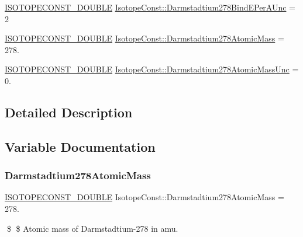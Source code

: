 \begin{DoxyCompactItemize}
\item 
\mbox{\hyperlink{group___isotope_const-_macros_ga8f45a7272ce02c0b4c65c44636ed719a}{I\+S\+O\+T\+O\+P\+E\+C\+O\+N\+S\+T\+\_\+\+D\+O\+U\+B\+LE}} \mbox{\hyperlink{group___isotope_const-_darmstadtium-_ds278_ga21a83523d3380e33e6805161f7bcd491}{Isotope\+Const\+::\+Darmstadtium278\+Bind\+E\+Per\+A\+Unc}} = 2
\item 
\mbox{\hyperlink{group___isotope_const-_macros_ga8f45a7272ce02c0b4c65c44636ed719a}{I\+S\+O\+T\+O\+P\+E\+C\+O\+N\+S\+T\+\_\+\+D\+O\+U\+B\+LE}} \mbox{\hyperlink{group___isotope_const-_darmstadtium-_ds278_ga30d00cea29a216f5c4fe86c6153258e9}{Isotope\+Const\+::\+Darmstadtium278\+Atomic\+Mass}} = 278.
\item 
\mbox{\hyperlink{group___isotope_const-_macros_ga8f45a7272ce02c0b4c65c44636ed719a}{I\+S\+O\+T\+O\+P\+E\+C\+O\+N\+S\+T\+\_\+\+D\+O\+U\+B\+LE}} \mbox{\hyperlink{group___isotope_const-_darmstadtium-_ds278_ga1bd7c172b951d49175e790cb5fa2947e}{Isotope\+Const\+::\+Darmstadtium278\+Atomic\+Mass\+Unc}} = 0.
\end{DoxyCompactItemize}


\subsection{Detailed Description}


\subsection{Variable Documentation}
\mbox{\label{group___isotope_const-_darmstadtium-_ds278_ga30d00cea29a216f5c4fe86c6153258e9}} 
\subsubsection{\texorpdfstring{Darmstadtium278\+Atomic\+Mass}{Darmstadtium278AtomicMass}}
{\footnotesize\ttfamily \mbox{\hyperlink{group___isotope_const-_macros_ga8f45a7272ce02c0b4c65c44636ed719a}{I\+S\+O\+T\+O\+P\+E\+C\+O\+N\+S\+T\+\_\+\+D\+O\+U\+B\+LE}} Isotope\+Const\+::\+Darmstadtium278\+Atomic\+Mass = 278.}

\$ \$ Atomic mass of Darmstadtium-\/278 in amu. \mbox{\label{group___isotope_const-_darmstadtium-_ds278_ga1bd7c172b951d49175e790cb5fa2947e}} 
